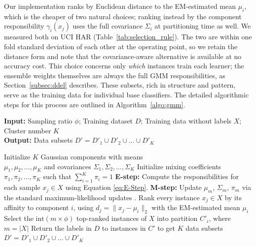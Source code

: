 \documentclass[lettersize,journal]{IEEEtran}
\begin{document}
	Our implementation ranks by Euclidean distance to the EM-estimated mean $\mu_i$, which
	is the cheaper of two natural choices; ranking instead by the component responsibility
	$\gamma_i(x_j)$ uses the full covariance $\Sigma_i$ at partitioning time as well. We
	measured both on UCI HAR (Table~\ref{tab:selection_rule}). The two are within one fold
	standard deviation of each other at the operating point, so we retain the distance form
	and note that the covariance-aware alternative is available at no accuracy cost. This
	choice concerns only \emph{which} instances train each learner; the ensemble weights
	themselves are always the full GMM responsibilities, as Section~\ref{subsec:ddel}
	describes. These subsets, rich in
	structure and pattern, serve as the training data for individual base classifiers.
	The detailed algorithmic steps for this process are outlined in Algorithm~\ref{algo:gmm}.
	
	\begin{algorithm}[!t]
		\caption{GMM Sampling}
		\label{algo:gmm}
		\textbf{Input:} Sampling ratio $\phi$; Training dataset $D$; Training data without labels $X$; Cluster number $K$ \\
		\textbf{Output:} Data subsets $D' = D'_1 \cup D'_2 \cup \dots \cup D'_K$
		\begin{algorithmic}[1]
			\State Initialize $K$ Gaussian components with means \\
			$\mu_1, \mu_2, \dots, \mu_K$ and covariances $\Sigma_1, \Sigma_2, \dots, \Sigma_K$
			\State Initialize mixing coefficients $\pi_1, \pi_2, \dots, \pi_K$ such that $\sum_{i=1}^{K} \pi_i = 1$
			\Repeat
			\State \textbf{E-step:} Compute the responsibilities for each sample $x_j \in X$ using Equation \ref{eq:E-Step}.
			\State \textbf{M-step:} Update $\mu_m$, $\Sigma_m$, $\pi_m$ via the standard maximum-likelihood updates \cite{dempster_maximum_1977}.
			\State Rank every instance $x_j \in X$ by its affinity to component $i$, using $d_j = \lVert x_j - \mu_i \rVert_2$ with the EM-estimated mean $\mu_i$
			\State Select the $\text{int}(m \times \phi)$ top-ranked instances of $X$ into partition $C'_i$, where $m = |X|$
			\EndFor
			\State {}
			\State Return the labels in $D$ to instances in $C'$ to get $K$ data subsets $D' = D'_1 \cup D'_2 \cup \dots \cup D'_K$
			\EndProcedure
		\end{algorithmic}
	\end{algorithm}
	
\end{document}
